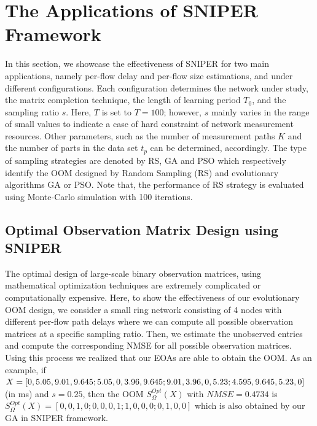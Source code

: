 \section{The Applications of SNIPER Framework} \label{sec:SNIPERResults}
In this section, we showcase the effectiveness of SNIPER for two main applications, namely per-flow delay and per-flow size estimations, and under different configurations. Each configuration determines the network under study, the matrix completion technique, the length of learning period $T_{0}$, and the sampling ratio $s$. Here, $T$ is set to $T=100$; however, $s$ mainly varies in the range of small values to indicate a case of hard constraint of network measurement resources. Other parameters, such as the number of measurement paths $K$ and the number of parts in the data set $t_{p}$ can be determined, accordingly. The type of sampling strategies are denoted by RS, GA and PSO which respectively identify the OOM designed by Random Sampling (RS) and evolutionary algorithms GA or PSO. Note that, the performance of RS strategy is evaluated using Monte-Carlo simulation with 100 iterations. 

\subsection{Optimal Observation Matrix Design using SNIPER}
The optimal design of large-scale binary observation matrices, using mathematical optimization techniques are extremely complicated or computationally expensive. Here, to show the effectiveness of our evolutionary OOM design, we consider a small ring network consisting of 4 nodes with different per-flow path delays where we can compute all possible observation matrices at a specific sampling ratio. Then, we estimate the unobserved entries and compute the corresponding NMSE for all possible observation matrices. Using this process we realized that our EOAs are able to obtain the OOM. As an example, if $X=[0,5.05,9.01,9.645;5.05,0,3.96,9.645;9.01,3.96,0,5.23; \\ 4.595,9.645,5.23,0]$ (in ms) and $s=0.25$, then the OOM $S_{\Omega}^{Opt}(X)$ with $NMSE=0.4734$ is $S_{\Omega}^{Opt}(X)=[0,0,1,0;0,0,0,1;1,0,0,0;0,1,0,0]$ which is also obtained by our GA in SNIPER framework.


